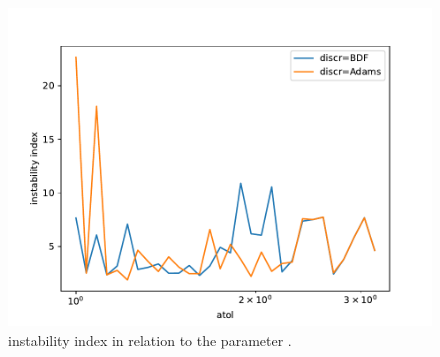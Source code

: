 \documentclass{scrartcl}
\begin{document}
\begin{figure}[h]
\centering
\begin{minipage}[b]{0.45\textwidth}
\centering
\includegraphics[width=\textwidth]{../Plots/Task4/Figure_404}
\caption{instability index in relation to the parameter .}
\label{pl:stability3}
\end{minipage}
\end{figure}
\end{document}

